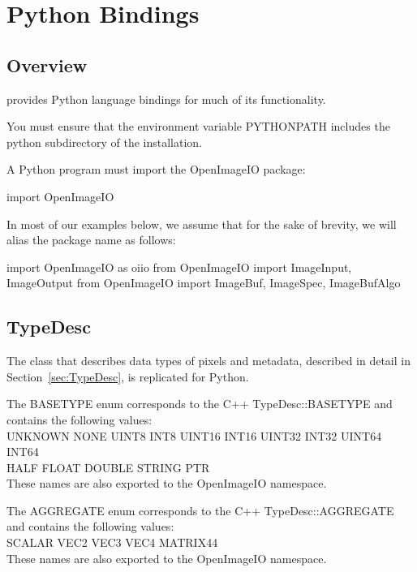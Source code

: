 \chapter{Python Bindings}
\label{chap:pythonbindings}

\section{Overview}

\OpenImageIO provides Python language bindings for much of its
functionality.

\smallskip

You must ensure that the environment variable {\cf PYTHONPATH} includes
the {\cf python} subdirectory of the \OpenImageIO installation.

\smallskip

A Python program must import the {\cf OpenImageIO} package:
\begin{code}
    import OpenImageIO
\end{code}
\noindent In most of our examples below, we assume that for the sake
of brevity, we will alias the package name as follows:
\begin{code}
    import OpenImageIO as oiio
    from OpenImageIO import ImageInput, ImageOutput
    from OpenImageIO import ImageBuf, ImageSpec, ImageBufAlgo
\end{code}

\section{TypeDesc}
\label{sec:pythontypedesc}

The \TypeDesc class that describes data types of pixels and metadata,
described in detail in Section~\ref{sec:TypeDesc}, is replicated for Python.

The {\cf BASETYPE} enum corresponds to the C++ {\cf TypeDesc::BASETYPE} and
contains the following values: \\
{\cf UNKNOWN NONE UINT8 INT8 UINT16 INT16 UINT32 INT32 UINT64 INT64 \\
HALF FLOAT DOUBLE STRING PTR} \\
These names are also exported to the {\cf OpenImageIO} namespace.
\apiend

The {\cf AGGREGATE} enum corresponds to the C++ {\cf TypeDesc::AGGREGATE} and
contains the following values: \\
{\cf SCALAR VEC2 VEC3 VEC4 MATRIX44} \\
These names are also exported to the {\cf OpenImageIO} namespace.
\apiend

